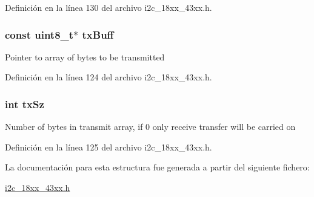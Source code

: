 Definición en la línea 130 del archivo i2c\+\_\+18xx\+\_\+43xx.\+h.

\subsubsection[{\texorpdfstring{tx\+Buff}{txBuff}}]{\setlength{\rightskip}{0pt plus 5cm}const uint8\+\_\+t$\ast$ tx\+Buff}\hypertarget{struct_i2_c___x_f_e_r___t_aa273a5a6ef5e2426562692030769f5d8}{}\label{struct_i2_c___x_f_e_r___t_aa273a5a6ef5e2426562692030769f5d8}
Pointer to array of bytes to be transmitted 

Definición en la línea 124 del archivo i2c\+\_\+18xx\+\_\+43xx.\+h.

\subsubsection[{\texorpdfstring{tx\+Sz}{txSz}}]{\setlength{\rightskip}{0pt plus 5cm}int tx\+Sz}\hypertarget{struct_i2_c___x_f_e_r___t_a3d14f9d3bba338401b8f8b0ff6ec0ea0}{}\label{struct_i2_c___x_f_e_r___t_a3d14f9d3bba338401b8f8b0ff6ec0ea0}
Number of bytes in transmit array, if 0 only receive transfer will be carried on 

Definición en la línea 125 del archivo i2c\+\_\+18xx\+\_\+43xx.\+h.



La documentación para esta estructura fue generada a partir del siguiente fichero\+:\begin{DoxyCompactItemize}
\item 
\hyperlink{i2c__18xx__43xx_8h}{i2c\+\_\+18xx\+\_\+43xx.\+h}\end{DoxyCompactItemize}
